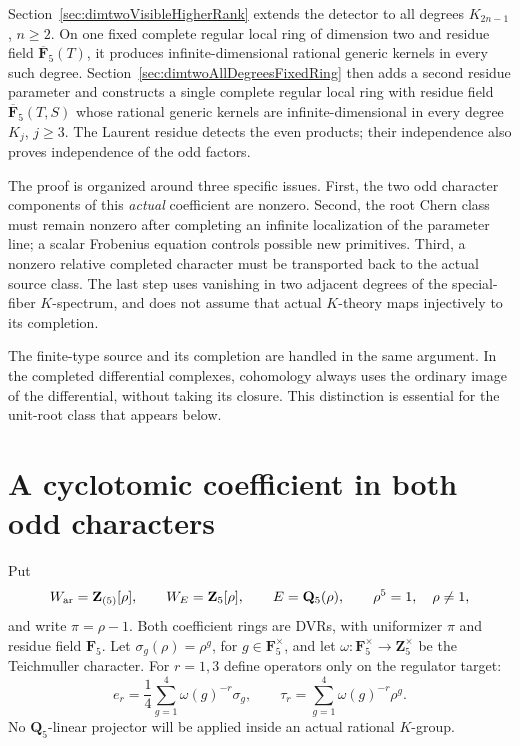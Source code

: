 \documentclass[11pt,a4paper]{article}
\theoremstyle{remark}
\newcommand{\F}{\mathbf F}
\begin{document}
Section~\ref{sec:dimtwoVisibleHigherRank} extends the detector to
all degrees $K_{2n-1}$, $n\ge2$. On one fixed complete regular local
ring of dimension two and residue field $\overline{\F}_5(T)$, it
produces infinite-dimensional rational generic kernels in every
such degree. Section~\ref{sec:dimtwoAllDegreesFixedRing} then adds
a second residue parameter and constructs a single complete regular
local ring with residue field $\overline{\F}_5(T,S)$ whose rational
generic kernels are infinite-dimensional in every degree $K_j$,
$j\ge3$. The Laurent residue detects the even products; their
independence also proves independence of the odd factors.

The proof is organized around three specific issues.  First,
the two odd character components of this \emph{actual}
coefficient are nonzero.  Second, the root Chern class must
remain nonzero after completing an infinite localization of the
parameter line; a scalar Frobenius equation controls possible
new primitives.  Third, a nonzero relative completed character
must be transported back to the actual source class.  The last
step uses vanishing in two adjacent degrees of the special-fiber
$K$-spectrum, and does not assume that actual $K$-theory maps
injectively to its completion.

The finite-type source and its completion are handled in the
same argument.  In the completed differential complexes,
cohomology always uses the ordinary image of the differential,
without taking its closure.  This distinction is essential for
the unit-root class that appears below.



\section{A cyclotomic coefficient in both odd characters}
\label{sec:dimtwoExplicitCoefficient}

Put
\[
 W_{\rm ar}=\mathbf Z_{(5)}[\rho],\qquad
 W_E=\mathbf Z_5[\rho],\qquad E=\mathbf Q_5(\rho),\qquad
 \rho^5=1,\quad \rho\ne1,
\]
and write $\pi=\rho-1$.  Both coefficient rings are DVRs, with
uniformizer $\pi$ and residue field $\mathbf F_5$.  Let
$\sigma_g(\rho)=\rho^g$, for $g\in\mathbf F_5^\times$, and let
$\omega:\mathbf F_5^\times\to\mathbf Z_5^\times$ be the Teichmuller
character.  For $r=1,3$ define operators only on the regulator target:
\[
 e_r=\frac14\sum_{g=1}^4\omega(g)^{-r}\sigma_g,
 \qquad \tau_r=\sum_{g=1}^4\omega(g)^{-r}\rho^g.
\]
No $\mathbf Q_5$-linear projector will be applied inside an actual
rational $K$-group.
\end{document}

